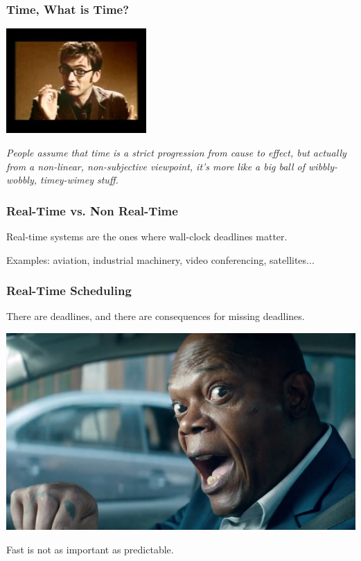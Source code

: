 \begin{frame}
\frametitle{Time, What is Time?}

\begin{center}
	\includegraphics[width=0.4\textwidth]{images/10thdoctor.jpg}
\end{center}

\textit{People assume that time is a strict progression from cause to effect, but actually from a non-linear, non-subjective viewpoint, it's more like a big ball of wibbly-wobbly, timey-wimey stuff.}


\end{frame}



\begin{frame}
\frametitle{Real-Time vs. Non Real-Time}

Real-time systems are the ones where wall-clock deadlines matter.

Examples: aviation, industrial machinery, video conferencing, satellites...

\end{frame}

\begin{frame}
\frametitle{Real-Time Scheduling}

There are deadlines, and there are consequences for missing deadlines. 

\begin{center}
	\includegraphics[width=\textwidth]{images/ticktock.jpg}
\end{center}

Fast is not as important as predictable.

\end{frame}

